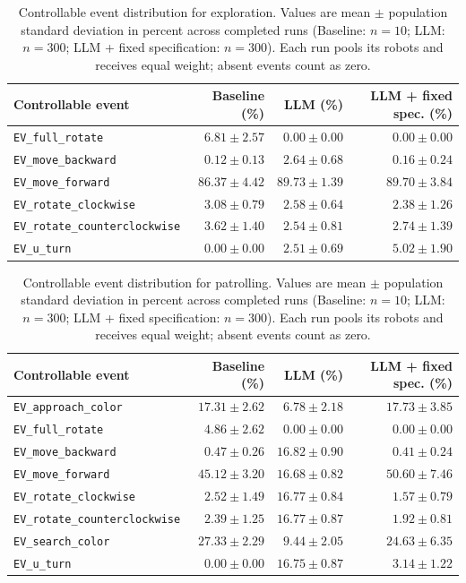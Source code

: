 
\begin{table}[htbp]
\centering
\small
\caption{Controllable event distribution for exploration. Values are mean $\pm$ population standard deviation in percent across completed runs (Baseline: $n=10$; LLM: $n=300$; LLM + fixed specification: $n=300$). Each run pools its robots and receives equal weight; absent events count as zero.}
\label{tab:exploration-controllable-events}
\begin{tabular}{lrrr}
\hline
Controllable event & Baseline (\%) & LLM (\%) & LLM + fixed spec. (\%) \\
\hline
\texttt{EV\_full\_rotate} & $6.81 \pm 2.57$ & $0.00 \pm 0.00$ & $0.00 \pm 0.00$ \\
\texttt{EV\_move\_backward} & $0.12 \pm 0.13$ & $2.64 \pm 0.68$ & $0.16 \pm 0.24$ \\
\texttt{EV\_move\_forward} & $86.37 \pm 4.42$ & $89.73 \pm 1.39$ & $89.70 \pm 3.84$ \\
\texttt{EV\_rotate\_clockwise} & $3.08 \pm 0.79$ & $2.58 \pm 0.64$ & $2.38 \pm 1.26$ \\
\texttt{EV\_rotate\_counterclockwise} & $3.62 \pm 1.40$ & $2.54 \pm 0.81$ & $2.74 \pm 1.39$ \\
\texttt{EV\_u\_turn} & $0.00 \pm 0.00$ & $2.51 \pm 0.69$ & $5.02 \pm 1.90$ \\
\hline
\end{tabular}
\end{table}

\begin{table}[htbp]
\centering
\small
\caption{Controllable event distribution for patrolling. Values are mean $\pm$ population standard deviation in percent across completed runs (Baseline: $n=10$; LLM: $n=300$; LLM + fixed specification: $n=300$). Each run pools its robots and receives equal weight; absent events count as zero.}
\label{tab:patrolling-controllable-events}
\begin{tabular}{lrrr}
\hline
Controllable event & Baseline (\%) & LLM (\%) & LLM + fixed spec. (\%) \\
\hline
\texttt{EV\_approach\_color} & $17.31 \pm 2.62$ & $6.78 \pm 2.18$ & $17.73 \pm 3.85$ \\
\texttt{EV\_full\_rotate} & $4.86 \pm 2.62$ & $0.00 \pm 0.00$ & $0.00 \pm 0.00$ \\
\texttt{EV\_move\_backward} & $0.47 \pm 0.26$ & $16.82 \pm 0.90$ & $0.41 \pm 0.24$ \\
\texttt{EV\_move\_forward} & $45.12 \pm 3.20$ & $16.68 \pm 0.82$ & $50.60 \pm 7.46$ \\
\texttt{EV\_rotate\_clockwise} & $2.52 \pm 1.49$ & $16.77 \pm 0.84$ & $1.57 \pm 0.79$ \\
\texttt{EV\_rotate\_counterclockwise} & $2.39 \pm 1.25$ & $16.77 \pm 0.87$ & $1.92 \pm 0.81$ \\
\texttt{EV\_search\_color} & $27.33 \pm 2.29$ & $9.44 \pm 2.05$ & $24.63 \pm 6.35$ \\
\texttt{EV\_u\_turn} & $0.00 \pm 0.00$ & $16.75 \pm 0.87$ & $3.14 \pm 1.22$ \\
\hline
\end{tabular}
\end{table}

